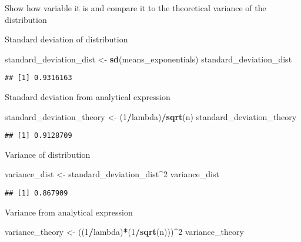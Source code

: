 \documentclass[
]{article}
\newenvironment{Shaded}{\begin{snugshade}}{\end{snugshade}}
\newcommand{\DecValTok}[1]{\textcolor[rgb]{0.00,0.00,0.81}{#1}}
\newcommand{\FunctionTok}[1]{\textcolor[rgb]{0.13,0.29,0.53}{\textbf{#1}}}
\newcommand{\NormalTok}[1]{#1}
\newcommand{\OtherTok}[1]{\textcolor[rgb]{0.56,0.35,0.01}{#1}}
\newcommand{\SpecialCharTok}[1]{\textcolor[rgb]{0.81,0.36,0.00}{\textbf{#1}}}
\begin{document}
Show how variable it is and compare it to the theoretical variance of
the distribution

Standard deviation of distribution

\begin{Shaded}
\begin{Highlighting}[]
\NormalTok{standard\_deviation\_dist }\OtherTok{\textless{}{-}} \FunctionTok{sd}\NormalTok{(means\_exponentials)}
\NormalTok{standard\_deviation\_dist}
\end{Highlighting}
\end{Shaded}

\begin{verbatim}
## [1] 0.9316163
\end{verbatim}

Standard deviation from analytical expression

\begin{Shaded}
\begin{Highlighting}[]
\NormalTok{standard\_deviation\_theory }\OtherTok{\textless{}{-}}\NormalTok{ (}\DecValTok{1}\SpecialCharTok{/}\NormalTok{lambda)}\SpecialCharTok{/}\FunctionTok{sqrt}\NormalTok{(n)}
\NormalTok{standard\_deviation\_theory}
\end{Highlighting}
\end{Shaded}

\begin{verbatim}
## [1] 0.9128709
\end{verbatim}

Variance of distribution

\begin{Shaded}
\begin{Highlighting}[]
\NormalTok{variance\_dist }\OtherTok{\textless{}{-}}\NormalTok{ standard\_deviation\_dist}\SpecialCharTok{\^{}}\DecValTok{2}
\NormalTok{variance\_dist}
\end{Highlighting}
\end{Shaded}

\begin{verbatim}
## [1] 0.867909
\end{verbatim}

Variance from analytical expression

\begin{Shaded}
\begin{Highlighting}[]
\NormalTok{variance\_theory }\OtherTok{\textless{}{-}}\NormalTok{ ((}\DecValTok{1}\SpecialCharTok{/}\NormalTok{lambda)}\SpecialCharTok{*}\NormalTok{(}\DecValTok{1}\SpecialCharTok{/}\FunctionTok{sqrt}\NormalTok{(n)))}\SpecialCharTok{\^{}}\DecValTok{2}
\NormalTok{variance\_theory}
\end{Highlighting}
\end{Shaded}
\end{document}
